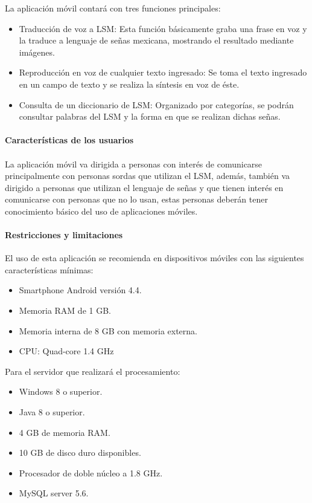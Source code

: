 La aplicación móvil contará con tres funciones principales:

\begin{itemize}
\item	Traducción de voz a LSM: Esta función básicamente graba una frase en voz y la traduce a lenguaje de señas mexicana, mostrando el resultado mediante imágenes.
\item	Reproducción en voz de cualquier texto ingresado: Se toma el texto ingresado en un campo de texto y se realiza la síntesis en voz de éste.
\item	Consulta de un diccionario de LSM: Organizado por categorías, se podrán consultar palabras del LSM y la forma en que se realizan dichas señas.
\end{itemize}

\paragraph{Características de los usuarios}\paragraph{}

La aplicación móvil va dirigida a personas con interés de comunicarse principalmente con personas sordas que utilizan el LSM, además, también va dirigido a personas que utilizan el lenguaje de señas y que tienen interés en comunicarse con personas que no lo usan, estas personas deberán tener conocimiento básico del uso de aplicaciones móviles.

\paragraph{Restricciones y limitaciones}

El uso de esta aplicación se recomienda en dispositivos móviles con las siguientes características mínimas:
\begin{itemize}
\item	Smartphone Android versión 4.4.
\item	Memoria RAM de 1 GB.
\item	Memoria interna de 8 GB con memoria externa.
\item	CPU: Quad-core 1.4 GHz
\end{itemize}

Para el servidor que realizará el procesamiento:
\begin{itemize}
\item	Windows 8 o superior.
\item	Java 8 o superior.
\item	4 GB de memoria RAM.
\item	10 GB de disco duro disponibles.
\item	Procesador de doble núcleo a 1.8 GHz.
\item	MySQL server 5.6.
\end{itemize}

